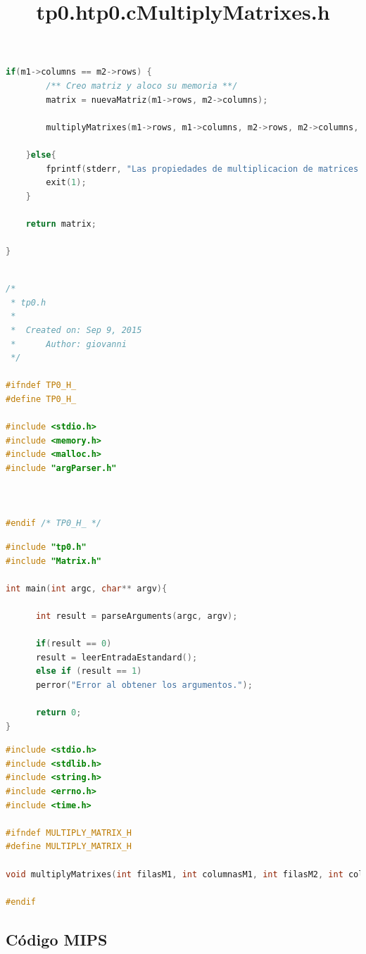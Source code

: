\documentclass[a4paper,10pt]{article}
\begin{document}
{\begin{lstlisting}[language=C]
	if(m1->columns == m2->rows) {
		/** Creo matriz y aloco su memoria **/
		matrix = nuevaMatriz(m1->rows, m2->columns);

		multiplyMatrixes(m1->rows, m1->columns, m2->rows, m2->columns, m1->values, m2->values, matrix->values);

	}else{
    	fprintf(stderr, "Las propiedades de multiplicacion de matrices no estan satisfechas.\n");
    	exit(1);
	}

	return matrix;

}



\end{lstlisting}


\title{tp0.h}
\begin{lstlisting}[language=C]
/*
 * tp0.h
 *
 *  Created on: Sep 9, 2015
 *      Author: giovanni
 */

#ifndef TP0_H_
#define TP0_H_

#include <stdio.h>
#include <memory.h>
#include <malloc.h>
#include "argParser.h"



#endif /* TP0_H_ */

\end{lstlisting}

\title{tp0.c}
\begin{lstlisting}[language=C]
#include "tp0.h"
#include "Matrix.h"

int main(int argc, char** argv){
	
      int result = parseArguments(argc, argv);
            
      if(result == 0)
	  result = leerEntradaEstandard();
      else if (result == 1)
	  perror("Error al obtener los argumentos.");
            
      return 0;
}
\end{lstlisting}

\title{MultiplyMatrixes.h}
\begin{lstlisting}[language=C]
#include <stdio.h>
#include <stdlib.h>
#include <string.h>
#include <errno.h>
#include <time.h>

#ifndef MULTIPLY_MATRIX_H
#define MULTIPLY_MATRIX_H

void multiplyMatrixes(int filasM1, int columnasM1, int filasM2, int columnasM2, float* valoresM1, float* valoresM2, float* valoresMR);

#endif

\end{lstlisting}


\subsection{C\'odigo MIPS}

}
\end{document}
